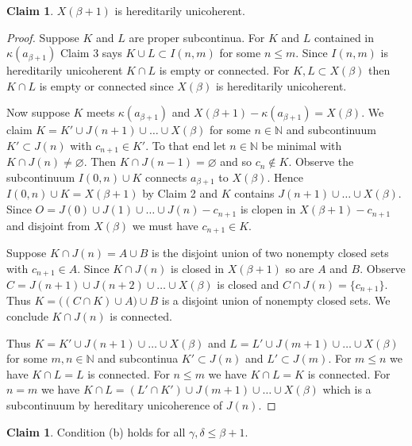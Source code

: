 \documentclass[12pt]{article}
\theoremstyle{plain}
\theoremstyle{definition}
\newcounter{claim5counter}
\newtheorem{claim5}[claim5counter]{Claim}
\newcommand{\K}{\ensuremath{\kappa}}
\newcommand{\B}{\ensuremath{\beta}}
\newcommand{\G}{\ensuremath{\gamma}}
\newcommand{\D}{\ensuremath{\delta}}
\newcommand{\NN}{\ensuremath{\mathbb N}}
\newcommand{\0}{\ensuremath{\varnothing}}
\begin{document}
	
	\begin{claim5}
		$X(\B+1)$ is hereditarily unicoherent.
	\end{claim5}
	
	\begin{proof}
		
		Suppose $K$ and $L$ are proper subcontinua.
		For $K$ and $L$ contained in $\K(a_{\B+1})$ Claim 3 says $K \cup L \subset I(n,m)$ for some $n \le m$. 
		Since $I(n,m)$ is hereditarily unicoherent $K \cap L$ is empty or connected.
		For $K ,L \subset X(\B)$ then $K \cap L$ is empty or connected since $X(\B)$ is hereditarily unicoherent. 
		
		Now suppose $K$ meets $\K(a_{\B+1})$ and $X(\B+1)-\K(a_{\B+1}) = X(\B)$.
		We claim $K =  K' \cup J(n+1) \cup \ldots \cup X(\B)$ 
		for some $n \in \NN$ and subcontinuum $K' \subset J(n)$ with $c_{n+1} \in K'$.
		To that end let $n \in \NN$ be minimal with $K \cap J(n) \ne \0$.
		Then $K \cap J(n-1) = \0$ and so $c_n \notin K$.
		Observe the subcontinuum $I(0,n) \cup K$ connects $a_{\B+1}$ to $X(\B)$.
		Hence $I(0,n) \cup K=X(\B+1)$ by Claim 2 and $K$ contains $J(n+1) \cup \ldots \cup X(\B)$.
		Since $O = J(0) \cup J(1) \cup \ldots \cup J(n) - c_{n+1}$ is clopen in $X(\B+1) - c_{n+1}$ and disjoint from $X(\B)$
		we must have $c_{n+1} \in K$.
		
		Suppose $K \cap J(n) = A \cup B$ is the disjoint union of two nonempty closed sets with $c_{n+1} \in A$.
		Since $K \cap J(n)$ is closed in $X(\B+1)$ so are $A$ and $B$.
		Observe $C = J(n+1) \cup J(n+2) \cup \ldots \cup X(\B)$ is closed and  $C \cap J(n) = \{c_{n+1}\}$.
		Thus $K = \big ( (C \cap K) \cup A \big ) \cup B$ is a disjoint union of nonempty closed sets.
		We conclude $K \cap J(n)$ is connected.
		
		Thus $K =  K' \cup J(n+1) \cup \ldots \cup X(\B)$ and  $L =  L' \cup J(m+1) \cup \ldots \cup X(\B)$
		for some $m,n \in \NN$ and subcontinua $K' \subset J(n)$ and $L' \subset J(m)$.
		For $m \le n$ we have $K \cap L = L$ is connected.
		For $n \le m$ we have $K \cap L = K$ is connected.
		For $n=m$ we have $K \cap L =  (L'\cap K') \cup J(m+1) \cup \ldots \cup X(\B)$ which is a subcontinuum by hereditary unicoherence of $J(n)$.
	\end{proof}
	
	
	\begin{claim5}
		Condition (b) holds for all $\G,\D \le \B+1$.
	\end{claim5}
	
\end{document}
